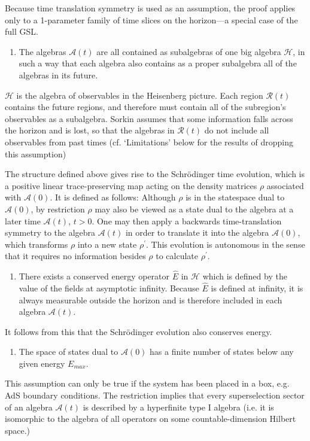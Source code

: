 \documentclass{article}
\begin{document}
\noindent
Because time translation symmetry is used as an assumption, the proof applies only to a 1-parameter family of time slices on the horizon---a special case of the full GSL.
\begin{enumerate}
\setcounter{enumi}{\value{comment}}

\item The algebras $\mathcal{A}(t)$ are all contained as subalgebras of one big algebra $\mathcal{H}$, in such a way that each algebra also contains as a proper subalgebra all of the algebras in its future.

\setcounter{comment}{\value{enumi}}
\end{enumerate}
\noindent
$\mathcal{H}$ is the algebra of observables in the Heisenberg picture.  Each region $\mathcal{R}(t)$ contains the future regions, and therefore must contain all of the subregion's observables as a subalgebra.  Sorkin assumes that some information falls across the horizon and is lost, so that the algebras in $\mathcal{R}(t)$ do not include all observables from past times (cf. `Limitations' below for the results of dropping this assumption)

The structure defined above gives rise to the Schr\"{o}dinger time evolution, which is a positive linear trace-preserving map acting on the density matrices $\rho$ associated with $\mathcal{A}(0)$.  It is defined as follows: Although $\rho$ is in the statespace dual to $\mathcal{A}(0)$, by restriction $\rho$ may also be viewed as a state dual to the algebra at a later time $\mathcal{A}(t)$, $t > 0$.  One may then apply a backwards time-translation symmetry to the algebra $\mathcal{A}(t)$ in order to translate it into the algebra $\mathcal{A}(0)$, which transforms $\rho$ into a new state $\rho^\prime$.  This evolution is autonomous in the sense that it requires no information besides $\rho$ to calculate $\rho^\prime$.
\begin{enumerate}
\setcounter{enumi}{\value{comment}}

\item There exists a conserved energy operator $\hat{E}$ in $\mathcal{H}$ which is defined by the value of the fields at asymptotic infinity.  Because $\hat{E}$ is defined at infinity, it is always measurable outside the horizon and is therefore included in each algebra $\mathcal{A}(t)$.

\setcounter{comment}{\value{enumi}}
\end{enumerate}
\noindent
It follows from this that the Schr\"{o}dinger evolution also conserves energy.
\begin{enumerate}
\setcounter{enumi}{\value{comment}}

\item The space of states dual to $\mathcal{A}(0)$ has a finite number of states below any given energy $E_{max}$.
\end{enumerate}
\noindent
This assumption can only be true if the system has been placed in a box, e.g. AdS boundary conditions.  The restriction implies that every superselection sector of an algebra $\mathcal{A}(t)$ is described by a hyperfinite type I algebra (i.e. it is isomorphic to the algebra of all operators on some countable-dimension Hilbert space.)
\end{document}
